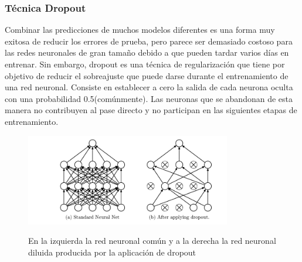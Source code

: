 		\vskip 0.4cm 
	\subsubsection {Técnica Dropout}
		\vskip 0.4cm 
		Combinar las predicciones de muchos modelos diferentes es una forma muy exitosa de reducir los errores de prueba, pero parece ser demasiado costoso para las redes neuronales de gran tamaño debido a que pueden tardar varios días en entrenar. Sin embargo, dropout es una técnica de regularización que tiene por objetivo de reducir el sobreajuste que puede darse durante el entrenamiento de una red neuronal. Consiste en establecer a cero la salida de cada neurona oculta con una probabilidad 0.5(comúnmente). Las neuronas que se abandonan de esta manera no contribuyen al pase directo y no participan en las siguientes etapas de entrenamiento.

		\begin{figure}[H]
		\begin{center}
		\includegraphics[width=0.8\textwidth]{images/marcoteorico/dropout_sample}
		\end{center}
		\begin{center}
		\caption{\small{En la izquierda la red neuronal común y a la derecha la red neuronal diluida producida por la aplicación de dropout}}
		{\small{\cite{AulaDNN}}}
		\end{center}
		\vspace{-1.5em}
		\end{figure}
		

